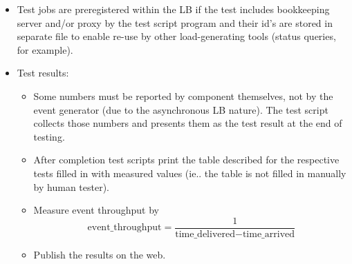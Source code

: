\begin{itemize}
\item Test jobs are preregistered within the LB if the test includes
bookkeeping server and/or proxy by the test script program and their id's are
stored in separate file to enable re-use by other load-generating tools (status
queries, for example).

\item Test results:
   \begin{itemize}
   \item Some numbers must be reported by component themselves, not by
      the event generator (due to the asynchronous LB nature). The
      test script collects those numbers and presents them as the test
      result at the end of testing.

    \item After completion test scripts print the table described for the
      respective tests filled in with measured values (ie.. the table
      is not filled in manually by human tester).

    \item Measure event throughput by
    \[ \mbox{event\_throughput} = \frac{1}{\mbox{time\_delivered} - \mbox{time\_arrived}} \]

    \item Publish the results on the web.
    
    \end{itemize}

%
\end{itemize}



\endinput


In the following subsections we describe performance and stress tests for
individual LB components.  They include both tests of the isolated components
on one node (may require binaries from other components to produce/consume
events) as well as tests of LB components among more nodes.


\subsection{Logging library test}

